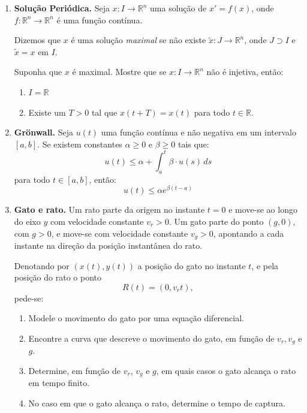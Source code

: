 \documentclass[a4paper,
11pt,  reqno]{amsart}
\begin{document}
\begin{enumerate}
\item \textbf{Solução Periódica.} Seja $x:I\to \mathbb{R}^n$ uma solução de $x'=f(x)$, onde $f:\mathbb{R}^n \to \mathbb{R}^n$ é uma função contínua. 

Dizemos que $x$ é uma solução \emph{maximal} se não existe $\tilde{x}:J \to \mathbb{R}^n$, onde $J \supset I$ e $\tilde{x} = x$ em $I$. 

Suponha que $x$ é maximal. Mostre que se $x:I\to \mathbb{R}^n$ não é injetiva, então:
\begin{enumerate}
    \item $I=\mathbb{R}$
    \item Existe um $T>0$ tal que $x(t+T)=x(t)$ para todo $t\in\mathbb{R}$.
\end{enumerate}

    \medskip


\item{{\bf Gr\"onwall.}} Seja $u(t)$ uma função contínua e não negativa em um intervalo $[a, b]$. Se existem constantes $\alpha \geq 0$ e $\beta \geq 0$ tais que:$$u(t) \leq \alpha + \int_{a}^{t} \beta \cdot u(s) \, ds$$para todo $t \in [a, b]$, então:$$u(t) \leq \alpha e^{\beta(t - a)}$$

    \medskip

 \item {\bf Gato e rato.} Um rato parte da origem no instante $t=0$ e move-se ao longo do eixo $y$ com velocidade constante $v_r>0$. Um gato parte do ponto $(g,0)$, com $g>0$, e move-se com velocidade constante $v_g>0$, apontando a cada instante na dire\c{c}\~ao da posi\c{c}\~ao instant\^anea do rato.

    Denotando por $(x(t),y(t))$ a posi\c{c}\~ao do gato no instante $t$, e pela posi\c{c}\~ao do rato o ponto
    \[
    R(t)=(0,v_r t),
    \]
    pede-se:

    \begin{enumerate}
        \item Modele o movimento do gato por uma equação diferencial.
        \item Encontre a curva que descreve o movimento do gato, em função de $v_r,v_g$ e $g$.
        \item Determine, em fun\c{c}\~ao de $v_r$, $v_g$ e $g$, em quais casos o gato alcan\c{c}a o rato em tempo finito.
        \item No caso em que o gato alcan\c{c}a o rato, determine o tempo de captura.
    \end{enumerate}

    \medskip


\end{enumerate}
\end{document}
